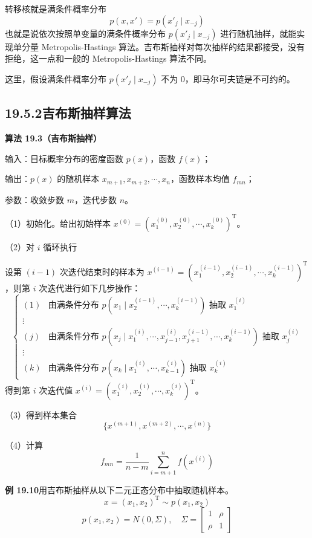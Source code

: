 \documentclass[UTF8, 12pt, fontset=fandol, oneside]{ctexart}
\begin{document}
转移核就是满条件概率分布
\begin{equation}
p(x,x')=p(x'_j\mid x_{-j})
\tag{19.51}
\end{equation}
也就是说依次按照单变量的满条件概率分布 $p(x'_j\mid x_{-j})$ 进行随机抽样，就能实现单分量 Metropolis-Hastings 算法。吉布斯抽样对每次抽样的结果都接受，没有拒绝，这一点和一般的 Metropolis-Hastings 算法不同。

这里，假设满条件概率分布 $p(x'_j\mid x_{-j})$ 不为 0，即马尔可夫链是不可约的。

\subsection*{19.5.2\quad 吉布斯抽样算法}

\noindent\textbf{算法 19.3（吉布斯抽样）}

输入：目标概率分布的密度函数 $p(x)$，函数 $f(x)$；

输出：$p(x)$ 的随机样本 $x_{m+1},x_{m+2},\cdots,x_n$，函数样本均值 $f_{mn}$；

参数：收敛步数 $m$，迭代步数 $n$。

（1）初始化。给出初始样本 $x^{(0)}=(x_1^{(0)},x_2^{(0)},\cdots,x_k^{(0)})^{\mathrm{T}}$。

（2）对 $i$ 循环执行

设第 $(i-1)$ 次迭代结束时的样本为 $x^{(i-1)}=(x_1^{(i-1)},x_2^{(i-1)},\cdots,x_k^{(i-1)})^{\mathrm{T}}$，则第 $i$ 次迭代进行如下几步操作：
\[
\left\{
\begin{array}{ll}
(1) & \text{由满条件分布 }p(x_1\mid x_2^{(i-1)},\cdots,x_k^{(i-1)})\text{ 抽取 }x_1^{(i)}\\
\vdots & \\
(j) & \text{由满条件分布 }p(x_j\mid x_1^{(i)},\cdots,x_{j-1}^{(i)},x_{j+1}^{(i-1)},\cdots,x_k^{(i-1)})\text{ 抽取 }x_j^{(i)}\\
\vdots & \\
(k) & \text{由满条件分布 }p(x_k\mid x_1^{(i)},\cdots,x_{k-1}^{(i)})\text{ 抽取 }x_k^{(i)}
\end{array}
\right.
\]
得到第 $i$ 次迭代值 $x^{(i)}=(x_1^{(i)},x_2^{(i)},\cdots,x_k^{(i)})^{\mathrm{T}}$。

（3）得到样本集合
\[
\{x^{(m+1)},x^{(m+2)},\cdots,x^{(n)}\}
\]

（4）计算
\[
f_{mn}=\frac{1}{n-m}\sum_{i=m+1}^{n}f(x^{(i)})
\]

\noindent\textbf{例 19.10}\quad 用吉布斯抽样从以下二元正态分布中抽取随机样本。
\[
x=(x_1,x_2)^{\mathrm{T}}\sim p(x_1,x_2)
\]
\[
p(x_1,x_2)=N(0,\Sigma),\quad
\Sigma=
\begin{bmatrix}
1 & \rho\\
\rho & 1
\end{bmatrix}
\]
\end{document}
